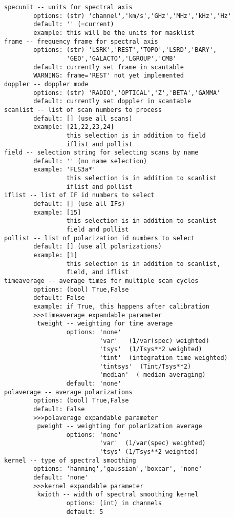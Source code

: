 \begin{verbatim}
specunit -- units for spectral axis
        options: (str) 'channel','km/s','GHz','MHz','kHz','Hz'
        default: '' (=current)
        example: this will be the units for masklist
frame -- frequency frame for spectral axis
        options: (str) 'LSRK','REST','TOPO','LSRD','BARY',
                 'GEO','GALACTO','LGROUP','CMB'
        default: currently set frame in scantable
        WARNING: frame='REST' not yet implemented
doppler -- doppler mode
        options: (str) 'RADIO','OPTICAL','Z','BETA','GAMMA'
        default: currently set doppler in scantable
scanlist -- list of scan numbers to process
        default: [] (use all scans)
        example: [21,22,23,24]
                 this selection is in addition to field
                 iflist and pollist
field -- selection string for selecting scans by name
        default: '' (no name selection)
        example: 'FLS3a*'
                 this selection is in addition to scanlist
                 iflist and pollist
iflist -- list of IF id numbers to select
        default: [] (use all IFs)
        example: [15]
                 this selection is in addition to scanlist
                 field and pollist
pollist -- list of polarization id numbers to select
        default: [] (use all polarizations)
        example: [1]
                 this selection is in addition to scanlist,
                 field, and iflist
timeaverage -- average times for multiple scan cycles
        options: (bool) True,False
        default: False
        example: if True, this happens after calibration
        >>>timeaverage expandable parameter
         tweight -- weighting for time average
                 options: 'none'
                          'var'   (1/var(spec) weighted)
                          'tsys'  (1/Tsys**2 weighted)
                          'tint'  (integration time weighted)
                          'tintsys'  (Tint/Tsys**2)
                          'median'  ( median averaging)
                 default: 'none'
polaverage -- average polarizations
        options: (bool) True,False
        default: False
        >>>polaverage expandable parameter
         pweight -- weighting for polarization average
                 options: 'none'
                          'var'  (1/var(spec) weighted)
                          'tsys' (1/Tsys**2 weighted)
kernel -- type of spectral smoothing
        options: 'hanning','gaussian','boxcar', 'none'
        default: 'none'
        >>>kernel expandable parameter
         kwidth -- width of spectral smoothing kernel
                 options: (int) in channels
                 default: 5

\end{verbatim}
